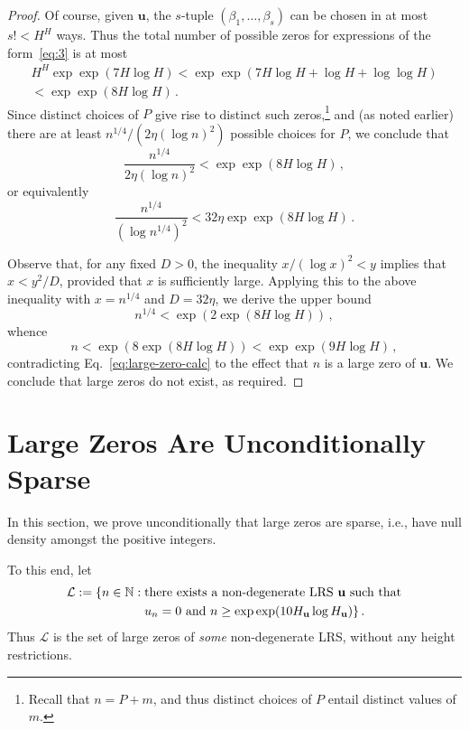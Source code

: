 \documentclass[preprint,12pt]{elsarticle}
\begin{document}
\begin{proof}
Of course, given $\mathbf{u}$, the $s$-tuple $(\beta_1,\ldots,\beta_s)$
can be chosen in at most $s!<H^H$ ways.
Thus the total number of possible zeros for expressions of the form~\eqref{eq:3} is
at most
\begin{multline*}
  H^H\exp \exp (7H\log H)<\exp \exp(7H\log H+\log H+\log\log H) \\ 
 <  \exp \exp (8H\log H) \, .
\end{multline*}
Since
distinct choices of $P$ give rise to distinct such
zeros,\footnote{Recall that $n = P + m$, and thus distinct choices of
  $P$ entail distinct values of $m$.} and (as
noted earlier) there are at least
$n^{1/4}/(2\eta(\log n)^2)$ possible choices for $P$,
we conclude that
\[
\frac{n^{1/4}}{2\eta(\log n)^2} < \exp \exp (8H\log H) \, ,
\]
or equivalently
\[ \frac{n^{1/4}}{(\log n^{1/4})^2} < 32\eta \exp \exp(8H \log H) \,
  . \]

Observe that, for any fixed $D>0$, the inequality $x/(\log x)^2 < y$
implies that $x < y^2/D$, provided that $x$ is sufficiently
large. Applying this to the above inequality with $x=n^{1/4}$ and
$D = 32\eta$, we derive the upper bound
\[ n^{1/4} < \exp(2\exp(8H \log H)) \, , \]
whence
\[ n < \exp(8\exp(8H \log H)) < \exp \exp (9H \log H) \, , \]
contradicting Eq.~\eqref{eq:large-zero-calc} to the effect that $n$ is
a large zero of $\mathbf{u}$. We conclude that large zeros do not
exist, as required.
\end{proof}

\section{Large Zeros Are Unconditionally Sparse}
\label{sec:sparse}

In this section, we prove unconditionally that large zeros are sparse,
i.e., have null density amongst the positive integers.

To this end, let
\begin{align*}
{\mathcal L} := \{n \in \mathbb{N} : {}&{\text{\rm there exists a
                                         non-degenerate LRS \textbf{u}
                                         such that}}\\ &
                                         u_n=0~{\text{\rm
    and}}~n\geq \exp \exp(10H_{\mathbf{u}}\log H_{\mathbf{u}})\} \, . 
\end{align*} 
Thus ${\mathcal L}$ is the set of large zeros of \emph{some}
non-degenerate LRS, without any height restrictions.
\end{document}
